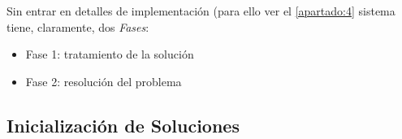 
Sin entrar en detalles de implementación (para ello ver el \autoref{apartado:4} sistema tiene, claramente, dos \textit{Fases}:
\begin{itemize}
	\item Fase 1: tratamiento de la solución
	\item Fase 2: resolución del problema
\end{itemize}


\subsection{Inicialización de Soluciones} \label{sec:3:inicializacion-soluciones}